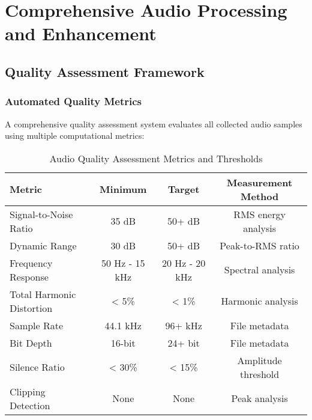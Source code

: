 \documentclass[12pt]{article}
\begin{document}
\section{Comprehensive Audio Processing and Enhancement}

\subsection{Quality Assessment Framework}

\subsubsection{Automated Quality Metrics}
A comprehensive quality assessment system evaluates all collected audio samples using multiple computational metrics:

\begin{table}[h]
\centering
\caption{Audio Quality Assessment Metrics and Thresholds}
\begin{tabular}{@{}lccc@{}}
\toprule
\textbf{Metric} & \textbf{Minimum} & \textbf{Target} & \textbf{Measurement Method} \\
\midrule
Signal-to-Noise Ratio & 35 dB & 50+ dB & RMS energy analysis \\
Dynamic Range & 30 dB & 50+ dB & Peak-to-RMS ratio \\
Frequency Response & 50 Hz - 15 kHz & 20 Hz - 20 kHz & Spectral analysis \\
Total Harmonic Distortion & < 5\% & < 1\% & Harmonic analysis \\
Sample Rate & 44.1 kHz & 96+ kHz & File metadata \\
Bit Depth & 16-bit & 24+ bit & File metadata \\
Silence Ratio & < 30\% & < 15\% & Amplitude threshold \\
Clipping Detection & None & None & Peak analysis \\
\bottomrule
\end{tabular}
\end{table}
\end{document}

